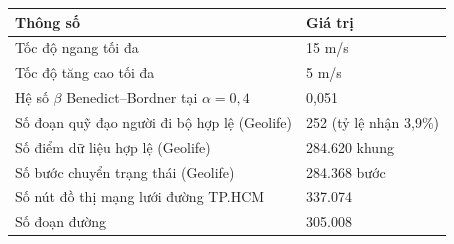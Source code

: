 \begin{table}[H]
\centering
\begin{tabular}{ll}
\toprule
\textbf{Thông số} & \textbf{Giá trị} \\
\midrule
Tốc độ ngang tối đa & 15 m/s \\
Tốc độ tăng cao tối đa & 5 m/s \\
Hệ số $\beta$ Benedict--Bordner tại $\alpha = 0{,}4$ & 0{,}051 \\
Số đoạn quỹ đạo người đi bộ hợp lệ (Geolife) & 252 (tỷ lệ nhận 3{,}9\%) \\
Số điểm dữ liệu hợp lệ (Geolife) & 284.620 khung \\
Số bước chuyển trạng thái (Geolife) & 284.368 bước \\
Số nút đồ thị mạng lưới đường TP.HCM & 337.074 \\
Số đoạn đường & 305.008 \\
\bottomrule
\end{tabular}
\end{table}

\clearpage
